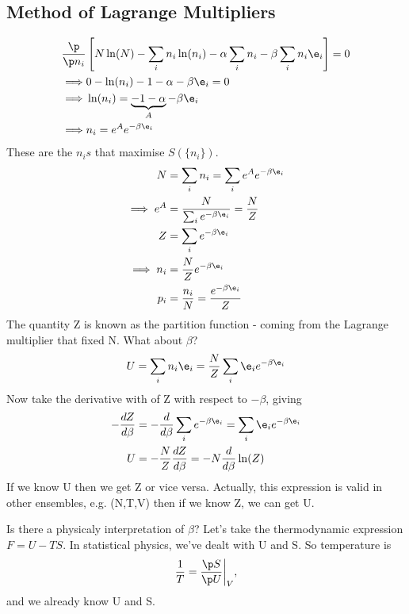 \documentclass[a4paper, 11pt, normalem]{report}
\begin{document}
\chapter{}
\section{Method of Lagrange Multipliers}
\begin{align}
    \frac{\p}{\p n_i}&\left[N\ln(N) - \sum_i n_i\ln(n_i) - \alpha\sum_i n_i - \beta\sum_i n_i\e_i\right] = 0 \\
    \implies &0 - \ln(n_i) - 1 - \alpha - \beta\e_i = 0 \\
    \implies & \ln(n_i) = \underbrace{-1 -\alpha}_{A} -\beta\e_i \\
    \implies &n_i = e^Ae^{-\beta\e_i}
\end{align}
These are the $n_is$ that maximise $S(\{n_i\})$.
\begin{align}
    N &= \sum_i n_i = \sum_i e^Ae^{-\beta\e_i} \\
    \implies e^A &= \frac{N}{\sum_i e^{-\beta\e_i}} = \frac{N}{Z} \\
    Z &= \sum_i e^{-\beta\e_i} \\
    \implies n_i &= \frac{N}{Z}e^{-\beta\e_i} \\
    p_i &= \frac{n_i}{N} = \frac{e^{-\beta\e_i}}{Z}
\end{align}
The quantity Z is known as the partition function - coming from the Lagrange multiplier that fixed N.
What about $\beta$?
\begin{equation}
    U = \sum_i n_i\e_i = \frac{N}{Z}\sum_i \e_ie^{-\beta\e_i}
\end{equation}
Now take the derivative with of Z with respect to $-\beta$, giving
\begin{align}
    -\frac{dZ}{d\beta} &= -\frac{d}{d\beta} \sum_i e^{-\beta\e_i} = \sum_i \e_i e^{-\beta\e_i} \\
    U &= -\frac{N}{Z}\frac{dZ}{d\beta} = -N\frac{d}{d\beta}\ln(Z)
\end{align}
If we know U then we get Z or vice versa.
Actually, this expression is valid in other ensembles, e.g. (N,T,V) then if we know Z, we can get U.

Is there a physicaly interpretation of $\beta$?
Let's take the thermodynamic expression $F = U - TS$.
In statistical physics, we've dealt with U and S.
So temperature is
\begin{equation}
    \frac{1}{T} = \frac{\p S}{\p U}\bigg|_V,
\end{equation}
and we already know U and S.
\end{document}
